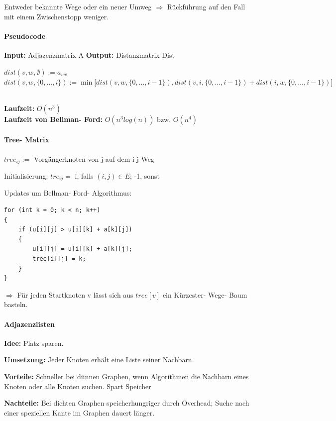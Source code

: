 \documentclass[fleqn]{scrartcl}
\begin{document}
Entweder bekannte Wege oder ein neuer Umweg $\Rightarrow$ Rückführung auf den Fall mit einem Zwischenstopp weniger.

\paragraph{Pseudocode} 
\textbf{Input:} Adjazenzmatrix A
\textbf{Output:} Distanzmatrix Dist
\begin{algorithmic}
\State $dist (v, w, \emptyset ) := a_{vw}$ 
\EndFor
\EndFor
{}
\State  $dist (v, w, \{0, ..., i\}) := \min \bigg[ dist(v, w, \{0, ..., i-1\}), dist (v, i, \{0, ..., i-1\}) + dist(i, w, \{0, ..., i-1\})\bigg]$
\EndFor
\EndFor
\EndFor
\end{algorithmic}
$ $\\
\textbf{Laufzeit:} $O(n^{3})$\\
\textbf{Laufzeit von Bellman- Ford:} $O (n^{3} log (n))$ bzw. $O (n^{4})$

\paragraph{Tree- Matrix}
$tree_{ij} :=$ Vorgängerknoten von j auf dem i-j-Weg

Initialisierung: $tre_{ij} = $ i, falls $(i, j) \in E$; -1, sonst

Updates um Bellman- Ford- Algorithmus:
\begin{lstlisting}
for (int k = 0; k < n; k++)
{
	if (u[i][j] > u[i][k] + a[k][j])
	{
		u[i][j] = u[i][k] + a[k][j];
		tree[i][j] = k;
	}
}
\end{lstlisting}
$\Rightarrow$ Für jeden Startknoten v lässt sich aus $tree[v]$ ein Kürzester- Wege- Baum basteln.

\paragraph{Adjazenzlisten}
\textbf{Idee:} Platz sparen.

\textbf{Umsetzung:} Jeder Knoten erhält eine Liste seiner Nachbarn.

\textbf{Vorteile:} Schneller bei dünnen Graphen, wenn Algorithmen die Nachbarn eines Knoten oder alle Knoten suchen. Spart Speicher

\textbf{Nachteile:} Bei dichten Graphen speicherhungriger durch Overhead; Suche nach einer speziellen Kante im Graphen dauert länger.
\end{document}
